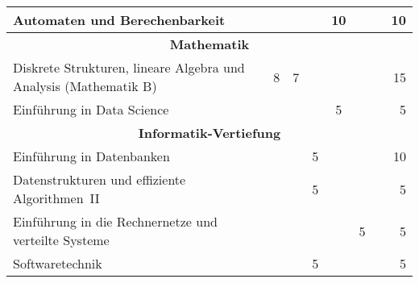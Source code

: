 \begin{table}[tbp]
\begin{small}
\begin{tabularx}{\textwidth}{|X||c|c|c|c|c|c||r|}
			Automaten und Berechenbarkeit                                         &    &    &    & 10 &    &                               &                                                                    10 \\ \hline\hline
			\multicolumn{8}{|c|}{\textbf{Mathematik}}                                                                                                                                                              \\ \hline
			Diskrete Strukturen, lineare Algebra und Analysis (Mathematik B)      & 8  & 7  &    &    &    &                               &                                                                    15 \\ \hline
			Einführung in Data Science                                            &    &    &    & 5  &    &                               &                                                                     5 \\ \hline\hline
			\multicolumn{8}{|c|}{\textbf{Informatik-Vertiefung}}                                                                                                                                                   \\ \hline
			Einführung in Datenbanken                                             &    &    & 5  &    &    &                               &                                                                    10 \\ \hline
			Datenstrukturen und effiziente Algorithmen~II                         &    &    & 5  &    &    &                               &                                                                     5 \\ \hline
			Einführung in die Rechnernetze und verteilte Systeme                  &    &    &    &    & 5  &                               &                                                                     5 \\ \hline
			Softwaretechnik                                                       &    &    & 5  &    &    &                               &                                                                     5 \\ \hline

\end{tabularx}
\end{small}
\end{table}
